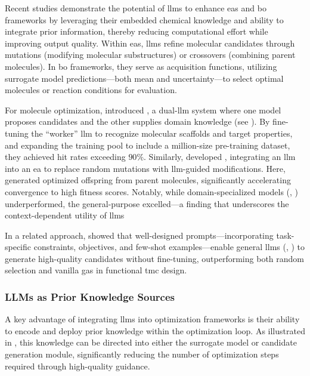 Recent studies demonstrate the potential of \glspl{llm} to enhance \glspl{ea} \autocite{lu2024generative} and \gls{bo} \autocite{amin2025towards} frameworks by leveraging their embedded chemical knowledge and ability to integrate prior information, thereby reducing computational effort while improving output quality.
Within \glspl{ea}, \glspl{llm} refine molecular candidates through mutations (modifying molecular substructures) or crossovers (combining parent molecules). 
In \gls{bo} frameworks, they serve as acquisition functions, utilizing surrogate model predictions---both mean and uncertainty---to select optimal molecules or reaction conditions for evaluation.

For molecule optimization, \textcite{yu2025collaborative} introduced , a dual-\gls{llm} system where one model proposes candidates and the other supplies domain knowledge (see ). 
By fine-tuning the \enquote{worker} \gls{llm} to recognize molecular scaffolds and target properties, and expanding the training pool to include a million-size pre-training dataset, they achieved hit rates exceeding $90\%$. 
Similarly, \textcite{wang2024efficient} developed , integrating an \gls{llm} into an \gls{ea} to replace random mutations with \gls{llm}-guided modifications. Here,  generated optimized offspring from parent molecules, significantly accelerating convergence to high fitness scores. 
Notably, while domain-specialized models (, ) underperformed, the general-purpose  excelled---a finding that underscores the context-dependent utility of \glspl{llm}

In a related approach, \textcite{lu2024generative} showed that well-designed prompts---incorporating task-specific constraints, objectives, and few-shot examples---enable general \glspl{llm} (, ) to generate high-quality candidates without fine-tuning, outperforming both random selection and vanilla \glspl{ga} in functional \gls{tmc} design.

\subsubsection{LLMs as Prior Knowledge Sources} \label{sec:opt-llm-know-source}

A key advantage of integrating \glspl{llm} into optimization frameworks is their ability to encode and deploy prior knowledge within the optimization loop. 
As illustrated in , this knowledge can be directed into either the surrogate model or candidate generation module, significantly reducing the number of optimization steps required through high-quality guidance.

